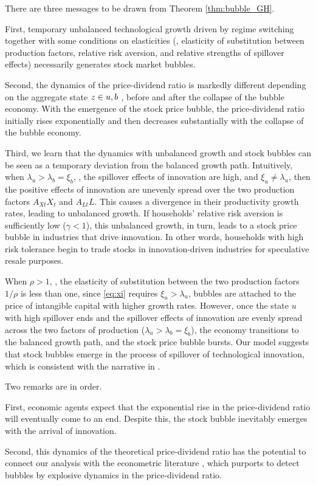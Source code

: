 \documentclass[a4paper,12pt]{article}
\numberwithin{equation}{section}
\theoremstyle{plain}
\begin{document}
There are three messages to be drawn from Theorem \ref{thm:bubble_GH}. \begin{enumerate*}
    \item First, temporary unbalanced technological growth driven by regime switching together with some conditions on elasticities (\eg, elasticity of substitution between production factors, relative risk aversion, and relative strengths of spillover effects) necessarily generates stock market bubbles. 
    \item Second, the dynamics of the price-dividend ratio is markedly different depending on the aggregate state $z\in \set{u,b}$ \ie, before and after the collapse of the bubble economy. With the emergence of the stock price bubble, the price-dividend ratio initially rises exponentially and then decreases substantially with the collapse of the bubble economy. 
    \item Third, we learn that the dynamics with unbalanced growth and stock bubbles can be seen as a temporary deviation from the balanced growth path. Intuitively, when $\lambda_u>\lambda_b=\xi_b$, \ie, the spillover effects of innovation are high, and $\xi_u \neq \lambda_u$, then the positive effects of innovation are unevenly spread over the two production factors $A_{Xt}X_t$ and $A_{Lt}L$. This causes a divergence in their productivity growth rates, leading to unbalanced growth. If households' relative risk aversion is sufficiently low ($\gamma<1$), this unbalanced growth, in turn, leads to a stock price bubble in industries that drive innovation. In other words, households with high risk tolerance begin to trade stocks in innovation-driven industries for speculative resale purposes.
\end{enumerate*}

When $\rho>1$, \ie, the elasticity of substitution between the two production factors $1/\rho$ is less than one, since \eqref{eq:xi} requires $\xi_u>\lambda_u$, bubbles are attached to the price of intangible capital with higher growth rates. However, once the state $u$ with high spillover ends and the spillover effects of innovation are evenly spread across the two factors of production ($\lambda_u>\lambda_b=\xi_b$), the economy transitions to the balanced growth path, and the stock price bubble bursts. Our model suggests that stock bubbles emerge in the process of spillover of technological innovation, which is consistent with the narrative in \citet{Scheinkman2014}.

Two remarks are in order. \begin{enumerate*}
    \item First, economic agents expect that the exponential rise in the price-dividend ratio will eventually come to an end. Despite this, the stock bubble inevitably emerges with the arrival of innovation.
    \item Second, this dynamics of the theoretical price-dividend ratio has the potential to connect our analysis with the econometric literature \citep*{PhillipsShiYu2015,PhillipsShi2018,PhillipsShi2020}, which purports to detect bubbles by explosive dynamics in the price-dividend ratio.
\end{enumerate*}
\end{document}
